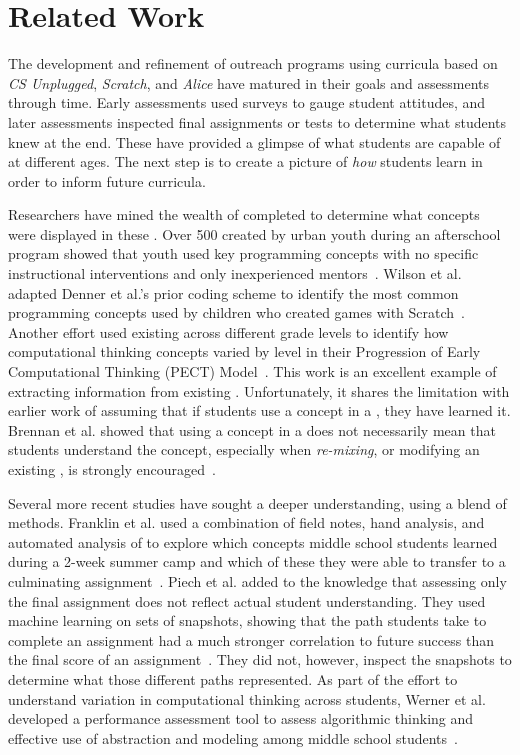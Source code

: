 \section{Related Work}
The development and refinement of outreach programs using curricula based on
\emph{CS Unplugged}, \emph{Scratch}, and \emph{Alice} have matured in their
goals and assessments through time. Early assessments used surveys to gauge
student attitudes, and later assessments inspected final assignments or tests
to determine what students knew at the end. These have provided a glimpse of
what students are capable of at different ages. The next step is to create a
picture of \emph{how} students learn in order to inform future curricula.

Researchers have mined the wealth of completed  to determine what
concepts were displayed in these . Over 500  created by
urban youth during an afterschool program showed that youth used key
programming concepts with no specific instructional interventions and only
inexperienced mentors~\cite{Maloney:2008:PCU:1352135.1352260}. Wilson et
al. adapted Denner et al.'s prior coding scheme to identify the most common
programming concepts used by children who created games with
Scratch~\cite{Denner:2012:CGC:2072695.2073050, wilson12}. Another effort used
existing  across different grade levels to identify how
computational thinking concepts varied by level in their Progression of Early
Computational Thinking (PECT)
Model~\cite{Seiter:2013:MLP:2493394.2493403}. This work is an excellent example
of extracting information from existing . Unfortunately, it shares
the limitation with earlier work of assuming that if students use a concept in
a \sprogram{}, they have learned it. Brennan et al. showed that using a concept
in a \sprogram{} does not necessarily mean that students understand the
concept, especially when \emph{re-mixing}, or modifying an existing
\sprogram{}, is strongly encouraged~\cite{brennan12}.

Several more recent studies have sought a deeper understanding, using a blend
of methods. Franklin et al. used a combination of field notes, hand analysis,
and automated analysis of  to explore which concepts middle school
students learned during a 2-week summer camp and which of these they were able
to transfer to a culminating assignment~\cite{Boe:2013:HLS:2445196.2445265,
  Franklin:2013:SBO}. Piech et al. added to the knowledge that assessing only
the final assignment does not reflect actual student understanding. They used
machine learning on sets of snapshots, showing that the path students take to
complete an assignment had a much stronger correlation to future success than
the final score of an assignment~\cite{Piech:2012:MSL:2157136.2157182}. They
did not, however, inspect the snapshots to determine what those different paths
represented. As part of the effort to understand variation in computational
thinking across students, Werner et al. developed a performance assessment tool
to assess algorithmic thinking and effective use of abstraction and modeling
among middle school students~\cite{Werner:2012:FPA:2157136.2157200}.

